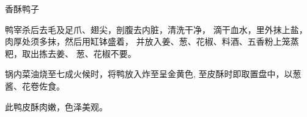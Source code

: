 \begin{recipe}{香酥鸭子}

\ingredients


\cooking

\step 	鸭宰杀后去毛及足爪、翅尖，剖腹去内脏，清洗干净， 滴干血水，里外抹上盐，肉厚处须多抹，然后用缸钵盛着， 并放入姜、葱、花椒、料酒、五香粉上笼蒸粑，取出拣去姜、 葱、花椒不要。

\step 	锅内菜油烧至七成火候时，将鸭放入炸至呈金黄色, 至皮酥时即取置盘中，以葱酱、花卷佐食。

\notes

此鸭皮酥肉嫩，色泽美观。

\end{recipe}

